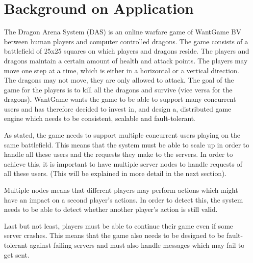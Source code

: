 \section{Background on Application }


The Dragon Arena System (DAS) is an online warfare game of WantGame BV between human players and computer controlled dragons.
The game consists of a battlefield of 25x25 squares on which players and dragons reside.
The players and dragons maintain a certain amount of health and attack points.
The players may move one step at a time, which is either in a horizontal or a vertical direction. 
The dragons may not move, they are only allowed to attack.
The goal of the game for the players is to kill all the dragons and survive (vice versa for the dragons).
WantGame wants the game to be able to support many concurrent users and has therefore decided to invest in, and design a, distributed game engine which needs to be consistent, scalable and fault-tolerant. 

As stated, the game needs to support multiple concurrent users playing on the same battlefield. 
This means that the system must be able to scale up in order to handle all these users and the requests they make to the servers. 
In order to achieve this, it is important to have multiple server nodes to handle requests of all these users. 
(This will be explained in more detail in the next section).

Multiple nodes means that different players may perform actions which might have an impact on a second player's actions.
In order to detect this, the system needs to be able to detect whether another player's action is still valid. 

Last but not least, players must be able to continue their game even if some server crashes. 
This means that the game also needs to be designed to be fault-tolerant against failing servers and must also handle messages which may fail to get sent.
